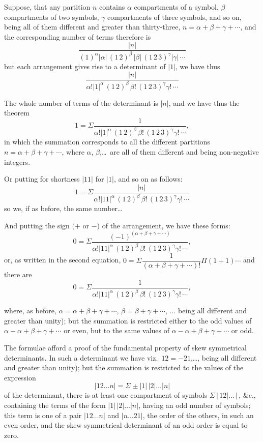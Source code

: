 \documentclass[11pt,a4paper]{article}
\begin{document}
\medskip

\noindent Suppose, that any partition $n$ contains $\alpha$ compartments of a symbol, $\beta$ compartments of two symbols, $\gamma$ compartments of three symbols, and so on, being all of them different and greater than thirty-three, $n=\alpha+\beta+\gamma+\cdots$,
and the corresponding number of terms therefore is
\[
\frac{|n|}{(1)^\alpha|\alpha|\,(1\,2)^\beta\,|\beta|\,(1\,2\,3)^\gamma|\gamma|\,\cdots}
\]
but each arrangement gives rise to a determinant of $|1|$, we have thus
\[
\frac{|n|}{\alpha!|1|^\alpha\,(1\,2)^\beta\,\beta!\,(1\,2\,3)^\gamma\gamma!\,\cdots}
\]
\clearpage

\noindent The whole number of terms of the determinant is $|n|$, and we have thus the theorem
\[
1=\Sigma\frac{1}{\alpha!|1|^\alpha\,(1\,2)^\beta\,\beta!\,(1\,2\,3)^\gamma\gamma!\,\cdots},
\]
in which the summation corresponds to all the different partitions $n=\alpha+\beta+\gamma+\cdots$, where $\alpha$, $\beta$,\ldots\ are all of them different and being non-negative integers.

\medskip

Or putting for shortness $|11|$ for $|1|$, and so on as follows:
\[
1=\Sigma\frac{|n|}{\alpha!|11|^\alpha\,(1\,2)^\beta\,\beta!\,(1\,2\,3)^\gamma\gamma!\,\cdots}
\]
so we, if as before, the same number\ldots

\medskip

And putting the sign $(+$ or $-)$ of the arrangement, we have these forms:
\[
0=\Sigma\frac{(-1)^{(\alpha+\beta+\gamma+\cdots)}}{\alpha!|11|^\alpha\,(1\,2)^\beta\,\beta!\,(1\,2\,3)^\gamma\gamma!\,\cdots},
\]
or, as written in the second equation, $0=\Sigma\dfrac{1}{(\alpha+\beta+\gamma+\cdots)!}\Pi(1+1)\cdots$
and there are
\[
0=\Sigma\frac{1}{\alpha!|11|^\alpha\,(1\,2)^\beta\,\beta!\,(1\,2\,3)^\gamma\gamma!\,\cdots},
\]
\clearpage

\noindent where, as before, $\alpha=\alpha+\beta+\gamma+\cdots$, $\beta=\beta+\gamma+\cdots$, $\ldots$ being all different and greater than unity); but the summation is restricted either to the odd values of $\alpha-\alpha+\beta+\gamma+\cdots$ or even, but to the same values of $\alpha-\alpha+\beta+\gamma+\cdots$ or odd.

\medskip

The formulae afford a proof of the fundamental property of skew symmetrical determinants. In such a determinant we have viz.\ $12=-21$,\ldots, being all different and greater than unity); but the summation is restricted to the values of the expression
\[
|12\ldots n|=\Sigma\pm|1|\,|2|\ldots|n|
\]
of the determinant, there is at least one compartment of symbols $\Sigma\,|\,12|\ldots\,|\,$, \&c., containing the terms of the form $|1|\,|2|\ldots|n|$, having an odd number of symbols; this term is one of a pair $|12\ldots n|$ and $|n\ldots 21|$, the order of the others, in such an even order, and the skew symmetrical determinant of an odd order is equal to zero.
\end{document}
